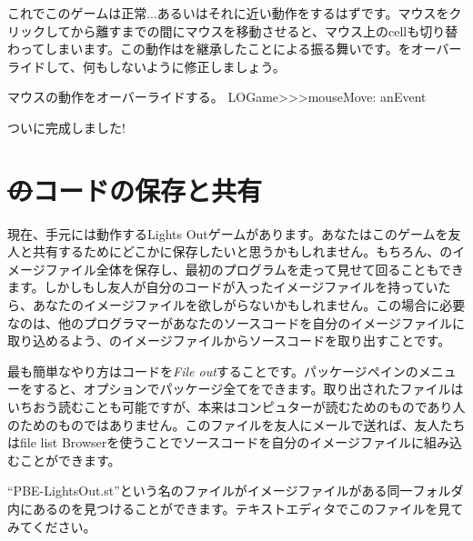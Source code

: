 \documentclass[a4paper,10pt,twoside]{book}
\begin{document}
これでこのゲームは正常...あるいはそれに近い動作をするはずです。マウスをクリックしてから離すまでの間にマウスを移動させると、マウス上のcellも切り替わってしまいます。この動作はを継承したことによる振る舞いです。をオーバーライドして、何もしないように修正しましょう。

\begin{method}[mouseMove:]{マウスの動作をオーバーライドする。}
LOGame>>>mouseMove: anEvent
\end{method}

ついに完成しました!


\section{\st のコードの保存と共有}

現在、手元には動作するLights Outゲームがあります。あなたはこのゲームを友人と共有するためにどこかに保存したいと思うかもしれません。もちろん、\pharo のイメージファイル全体を保存し、最初のプログラムを走って見せて回ることもできます。しかしもし友人が自分のコードが入ったイメージファイルを持っていたら、あなたのイメージファイルを欲しがらないかもしれません。この場合に必要なのは、他のプログラマーがあなたのソースコードを自分のイメージファイルに取り込めるよう、\pharo のイメージファイルからソースコードを取り出すことです。

最も簡単なやり方はコードを\emph{File out}することです。パッケージペインのメニューを\actclick すると、オプションでパッケージ全てをできます。取り出されたファイルはいちおう読むことも可能ですが、本来はコンピュターが読むためのものであり人のためのものではありません。このファイルを友人にメールで送れば、友人たちはfile list Browserを使うことでソースコードを自分の\pharo イメージファイルに組み込むことができます。


``PBE-LightsOut.st''という名のファイルがイメージファイルがある同一フォルダ内にあるのを見つけることができます。テキストエディタでこのファイルを見てみてください。
\end{document}
